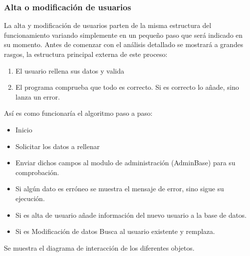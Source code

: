 \subsubsection{Alta o modificación de usuarios}
La alta y modificación de usuarios parten de la misma estructura del funcionamiento variando simplemente en un pequeño paso que será indicado en su momento. Antes de comenzar con el análisis detallado se mostrará a grandes rasgos, la estructura principal externa de este proceso:\\
\begin{enumerate}
\item El usuario rellena sus datos y valida
\item El programa comprueba que todo es correcto. Si es correcto lo añade, sino lanza un error.
\end{enumerate}
Así es como funcionaría el algoritmo paso a paso:
\begin{itemize}
\item Inicio
\item Solicitar los datos a rellenar
\item Enviar dichos campos al modulo de administración (AdminBase) para su comprobación.
\item Si algún dato es erróneo se muestra el mensaje de error, sino sigue su ejecución.
\item Si es alta de usuario añade información del nuevo usuario a la base de datos.
\item Si es Modificación de datos Busca al usuario existente y remplaza.
\end{itemize}
Se muestra el diagrama de interacción de los diferentes objetos.
